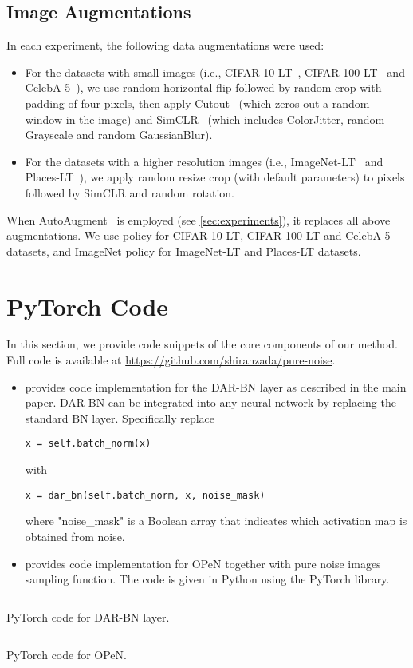 \documentclass[nohyperref]{article}
\theoremstyle{plain}
\theoremstyle{definition}
\theoremstyle{remark}
\begin{document}
\subsection{Image Augmentations}
In each experiment, the following data augmentations were used:
\begin{itemize}[leftmargin=*]
    \item  For the datasets with small images (i.e., CIFAR-10-LT~\cite{cao2019learning}, CIFAR-100-LT~\cite{cao2019learning} and CelebA-5~\cite{kim2020m2m}), we use random horizontal flip followed by random crop with padding of four pixels, then apply Cutout~\cite{devries2017improved} (which zeros out a random  window in the image) and SimCLR~\cite{chen2020simple} (which includes ColorJitter, random Grayscale and random GaussianBlur).
    \item  For the datasets with a higher resolution images (i.e., ImageNet-LT~\cite{liu2019large} and Places-LT~\cite{liu2019large}), we apply random resize crop (with default parameters) to  pixels followed by SimCLR and random rotation.
\end{itemize}

\noindent When AutoAugment~\cite{cubuk2019autoaugment} is employed (see \cref{sec:experiments}), it replaces all above augmentations. We use  policy for CIFAR-10-LT, CIFAR-100-LT and CelebA-5 datasets, and ImageNet policy for ImageNet-LT and Places-LT datasets.

\vspace{-0.3em}
\section{PyTorch Code}\label{sec:code}
In this section, we provide code snippets of the core components of our method.\\
Full code is available at \hyperlink{https://github.com/shiranzada/pure-noise}{https://github.com/shiranzada/pure-noise}.
\vspace{-0.7em}
\begin{itemize}
    \item {} provides code implementation for the DAR-BN layer as described in the main paper. DAR-BN can be integrated into any neural network by replacing the standard BN layer. Specifically replace

\begin{lstlisting}[numbers=none]
x = self.batch_norm(x)
\end{lstlisting}
    with
\begin{lstlisting}[numbers=none]
x = dar_bn(self.batch_norm, x, noise_mask)
\end{lstlisting}
    where "noise\_mask" is a Boolean array that indicates which activation map is obtained from noise.
    
    \item {} provides code implementation for OPeN together with pure noise images sampling function. The code is given in Python using the PyTorch library.
\end{itemize}

\begin{listing*}[h!]
\inputminted{python}{dar_bn1.py}
\caption{PyTorch code for DAR-BN layer.}
\label{listing:DAR_BN}
\end{listing*}

\begin{listing*}
\inputminted{python}{OPeN1.py}
\caption{PyTorch code for OPeN.}
\label{listing:OPeN}
\end{listing*} 
\end{document}
